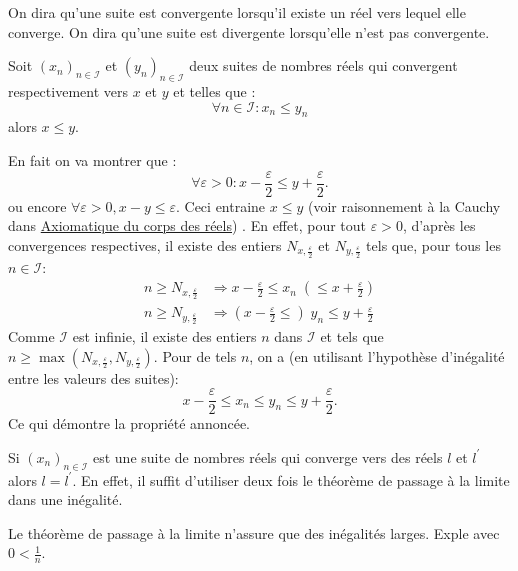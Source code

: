 \begin{defi} 
 On dira qu'une suite est convergente lorsqu'il existe un réel vers lequel elle converge. On dira qu'une suite est divergente lorsqu'elle n'est pas convergente.
\end{defi}
\begin{thmn}
 Soit $\left(x_n \right)_{n\in\mathcal I}$ et $\left(y_n \right)_{n\in\mathcal I}$ deux suites de nombres réels qui convergent respectivement vers $x$ et $y$ et telles que :
\begin{displaymath}
 \forall n \in \mathcal I : x_n \leq y_n
\end{displaymath}
alors $x \leq y$.
\end{thmn}
\begin{demo}
En fait on va montrer que :
\begin{displaymath}
\forall \varepsilon > 0 : x-\frac{\varepsilon}{2} \leq y + \frac{\varepsilon}{2}. 
\end{displaymath}
ou encore $\forall \varepsilon >0, x - y \leq \varepsilon$. Ceci entraine $x\leq y$ (voir \og raisonnement à la Cauchy\fg {} dans \href{\baseurl C2192.pdf}{Axiomatique du corps des réels}) .\newline
En effet, pour tout $\varepsilon >0$, d'après les convergences respectives, il existe des entiers $N_{x,\frac{\varepsilon}{2}}$ et $N_{y,\frac{\varepsilon}{2}}$ tels que, pour tous les $n\in \mathcal I$:
\begin{align*}
 n \geq N_{x,\frac{\varepsilon}{2}} &\Rightarrow x-\frac{\varepsilon}{2} \leq x_n \; \left( \leq x + \frac{\varepsilon}{2}\right) \\
 n \geq N_{y,\frac{\varepsilon}{2}} &\Rightarrow \left( x- \frac{\varepsilon}{2} \leq \right)\; y_n  \leq y + \frac{\varepsilon}{2}
\end{align*}
Comme $\mathcal I$ est infinie, il existe des entiers $n$ dans $\mathcal I$ et tels que $ n \geq \max(N_{x,\frac{\varepsilon}{2}},N_{y,\frac{\varepsilon}{2}})$.\newline
Pour de tels $n$, on a (en utilisant l'hypothèse d'inégalité entre les valeurs des suites):
\begin{displaymath}
 x - \frac{\varepsilon}{2} \leq x_n \leq y_n \leq y + \frac{\varepsilon}{2}.
\end{displaymath}
Ce qui démontre la propriété annoncée.
\end{demo}
\begin{rem}
 Si $\left(x_n \right)_{n\in\mathcal I}$ est une suite de nombres réels qui converge vers des réels $l$ et $l^\prime$ alors $l=l^\prime$. En effet, il suffit d'utiliser deux fois le théorème de passage à la limite dans une inégalité.
\end{rem}
\begin{rem}
Le théorème de passage à la limite n'assure que des inégalités larges. Exple avec $0 < \frac{1}{n}$.  
\end{rem}

